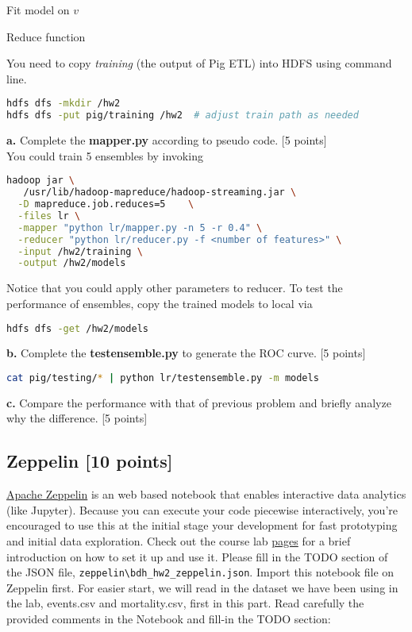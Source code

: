\documentclass[12pt]{article}
\begin{document}
\begin{algorithm}
Fit model on $v$\;
\caption{Reduce function}\label{algo_reduce}
\end{algorithm}
You need to copy \textit{training} (the output of Pig ETL) into HDFS using command line.
\begin{lstlisting}[language=bash,frame=single]
hdfs dfs -mkdir /hw2
hdfs dfs -put pig/training /hw2  # adjust train path as needed
\end{lstlisting}
\textbf{a.} Complete the \textbf{mapper.py} according to pseudo code. [5 points]\\
You could train 5 ensembles by invoking
\begin{lstlisting}[language=bash,frame=single]
hadoop jar \
   /usr/lib/hadoop-mapreduce/hadoop-streaming.jar \
  -D mapreduce.job.reduces=5    \
  -files lr \
  -mapper "python lr/mapper.py -n 5 -r 0.4" \
  -reducer "python lr/reducer.py -f <number of features>" \
  -input /hw2/training \
  -output /hw2/models
\end{lstlisting}
Notice that you could apply other parameters to reducer. To test the performance of ensembles, copy the trained models to local via
\begin{lstlisting}[language=bash,frame=single]
hdfs dfs -get /hw2/models
\end{lstlisting}
\textbf{b.} Complete the \textbf{testensemble.py} to generate the ROC curve. [5 points]
\begin{lstlisting}[language=bash,frame=single]
cat pig/testing/* | python lr/testensemble.py -m models
\end{lstlisting}
\textbf{c.} Compare the performance with that of previous problem and briefly analyze why the difference. [5 points]
\iffalse
\subsection{Zeppelin [10 points]}
\href{http://zeppelin.apache.org/}{Apache Zeppelin} is an web based notebook that enables interactive data analytics (like Jupyter).
Because you can execute your code piecewise interactively, you're encouraged to use this at the initial stage your development for fast prototyping and initial data exploration. Check out the course lab \href{http://www.sunlab.org/teaching/cse6250/spring2018/lab/zeppelin-intro/}{pages} for a brief introduction on how to set it up and use it. Please fill in the TODO section of the JSON file, \texttt{zeppelin\textbackslash bdh\_hw2\_zeppelin.json}. Import this notebook file on Zeppelin first.
For easier start, we will read in the dataset we have been using in the lab, events.csv and mortality.csv, first in this part. Read carefully the provided comments in the Notebook and fill-in the TODO section:
\end{document}

